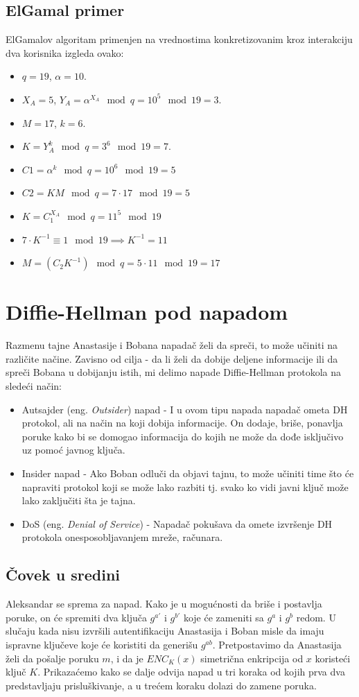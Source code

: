 \documentclass[a4paper]{article}
\begin{document}
\subsection{ElGamal primer}
ElGamalov algoritam primenjen na vrednostima konkretizovanim kroz interakciju dva korisnika izgleda ovako:
\begin{itemize}
  \item $q=19$, $\alpha=10$. 
  \item $X_A=5$, $Y_A=\alpha^{X_A}\mod q=10^5\mod 19=3$.
  \item $M=17$, $k=6$.
  \item $K=Y_A^k\mod q=3^6\mod 19=7$.
  \item $C1=\alpha^k \mod q=10^6\mod 19=5$
  \item $C2=KM\mod q=7\cdot17\mod 19=5$
  \item $K=C_1^{X_A}\mod q=11^5\mod 19$
  \item $7\cdot K^{-1} \equiv 1 \mod 19 \implies K^{-1}=11$
  \item $M=(C_2K^{-1})\mod q=5\cdot 11 \mod 19=17$
\end{itemize}

\section{Diffie-Hellman pod napadom}
Razmenu tajne Anastasije i Bobana napadač želi da spreči, to može učiniti na različite načine. Zavisno od cilja - da li želi da dobije deljene informacije ili da spreči Bobana u dobijanju istih, mi delimo napade Diffie-Hellman protokola na sledeći način:
\begin{itemize}
\item Autsajder (eng. \emph{Outsider}) napad - I u ovom tipu napada napadač ometa DH protokol, ali na način na koji dobija informacije. On dodaje, briše, ponavlja poruke kako bi se domogao informacija do kojih ne može da dođe isključivo uz pomoć javnog ključa.
\item Insider napad - Ako Boban odluči da objavi tajnu, to može učiniti time što će napraviti protokol koji se može lako razbiti tj. svako ko vidi javni ključ može lako zaključiti šta je tajna.
\item DoS (eng. \emph{Denial of Service}) - Napadač pokušava da omete izvršenje DH protokola onesposobljavanjem mreže, računara. \cite{dhpaper}
\end{itemize}


\subsection{Čovek u sredini}
Aleksandar se sprema za napad. Kako je u mogućnosti da briše i postavlja poruke, on će spremiti dva ključa $g^{a'}$ i $g^{b'}$ koje će zameniti sa $g^{a}$ i $g^{b}$ redom. U slučaju kada nisu izvršili autentifikaciju Anastasija i Boban misle da imaju ispravne ključeve koje će koristiti da generišu $g^{ab}$. Pretpostavimo da Anastasija želi da pošalje poruku $m$, i da je $ENC_{K}(x)$ simetrična enkripcija od $x$ koristeći ključ $K$. Prikazaćemo kako se dalje odvija napad u tri koraka od kojih prva dva predstavljaju prisluškivanje, a u trećem koraku dolazi do zamene poruka.
\end{document}

